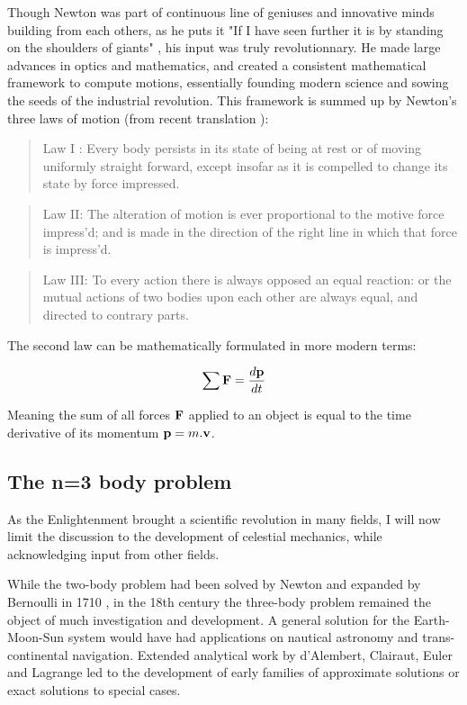 Though Newton was part of continuous line of geniuses and innovative minds building from each others, as he puts it "If I have seen further it is by standing on the shoulders of giants" \citep{Maury1992}, his input was truly revolutionnary. He made large advances in optics and mathematics, and created a consistent mathematical framework to compute motions, essentially founding modern science and sowing the seeds of the industrial revolution. This framework is summed up by Newton's three laws of motion (from recent translation \citealt{Cohen1999}):

\begin{quote}
Law I : Every body persists in its state of being at rest or of moving uniformly straight forward, except insofar as it is compelled to change its state by force impressed.
\end{quote}

\begin{quote}
Law II: The alteration of motion is ever proportional to the motive force impress'd; and is made in the direction of the right line in which that force is impress'd.
\end{quote}
 
 \begin{quote}
 Law III: To every action there is always opposed an equal reaction: or the mutual actions of two bodies upon each other are always equal, and directed to contrary parts.
 \end{quote}

The second law can be mathematically formulated in more modern terms:

\begin{equation}
\sum \bold{F} = \frac{d \bold{p}}{dt}
\end{equation}

Meaning the sum of all forces $\bold{F}$ applied to an object is equal to the time derivative of its momentum $\bold{p} = m.\bold{v}$.



\subsection{The n=3 body problem}

As the Enlightenment brought a scientific revolution in many fields, I will now limit the discussion to the development of celestial mechanics, while acknowledging input from other fields.

While the two-body problem had been solved by Newton and expanded by Bernoulli in 1710 \citep{Barrow1997}, in the 18th century the three-body problem remained the object of much investigation and development. A general solution for the Earth-Moon-Sun system would have had applications on nautical astronomy and trans-continental navigation. Extended analytical work by d'Alembert, Clairaut, Euler and Lagrange led to the development of early families of approximate solutions or exact solutions to special cases.

